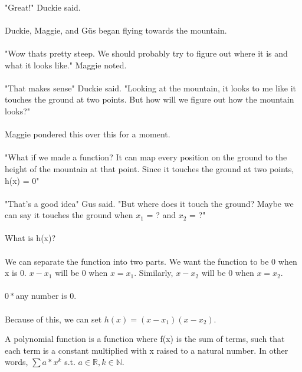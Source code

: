 \paragraph{} "Great!" Duckie said. 
\vfill
\pagebreak
{}
{\paragraph{} Duckie, Maggie, and G{\"u}s began flying towards the mountain. 
\paragraph{} "Wow thats pretty steep. We should probably try to figure out where it is and what it looks like." Maggie noted. 
\paragraph{} "That makes sense" Duckie said. "Looking at the mountain, it looks to me like it touches the ground at two points. But how will we figure out how the mountain looks?"
\paragraph{} Maggie pondered this over this for a moment.
\paragraph{} "What if we made a function? It can map every position on the ground to the height of the mountain at that point. Since it touches the ground at two points, h(x) = 0"
\paragraph{} "That's a good idea" Gus said. "But where does it touch the ground? Maybe we can say it touches the ground when $x_1$ = ? and $x_2$ = ?"
\paragraph{} What is h(x)?}
{
	\paragraph{} We can separate the function into two parts. We want the function to be 0 when x is 0. 
	$x-x_1$ will be 0 when $x = x_1$. Similarly, $x-x_2$ will be 0 when $x=x_2$. 
	\paragraph{} $0\ast$any number is 0. 
	\paragraph{} Because of this, we can set $h(x)=(x-x_1)(x-x_2)$.
}
{A polynomial function is a function where f(x) is the sum of terms, such that each term is a constant multiplied with x raised to a natural number. In other words, $\sum a*x^{k}$ s.t. $a \in \mathbb{R}, k \in \mathbb{N}$.}
{}

